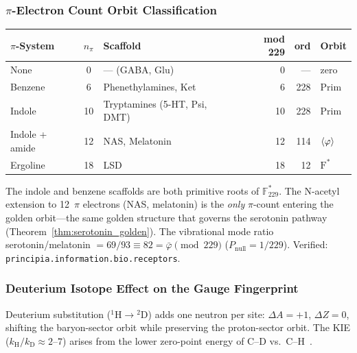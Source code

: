 \subsubsection{$\pi$-Electron Count Orbit Classification}

\begin{center}
\begin{tabular}{@{}lclrrl@{}}
\toprule
\textbf{$\pi$-System} & $n_\pi$ & \textbf{Scaffold} & \textbf{mod 229} & \textbf{ord} & \textbf{Orbit} \\
\midrule
None                   & 0  & --- (GABA, Glu)           & 0  & --- & zero \\
Benzene                & 6  & Phenethylamines, Ket      & 6  & 228 & Prim \\
Indole                 & 10 & Tryptamines (5-HT, Psi, DMT) & 10 & 228 & Prim \\
Indole + amide         & 12 & NAS, Melatonin            & 12 & 114 & $\langle\varphi\rangle$ \\
Ergoline               & 18 & LSD                       & 18 &  12 & $\mathrm{F}^*$ \\
\bottomrule
\end{tabular}
\end{center}

\begin{remark}
\label{rem:pi_golden}
The indole and benzene scaffolds are both primitive roots of $\mathbb{F}_{229}^*$. The N-acetyl extension to 12~$\pi$ electrons (NAS, melatonin) is the \emph{only} $\pi$-count entering the golden orbit---the same golden structure that governs the serotonin pathway (Theorem~\ref{thm:serotonin_golden}). The vibrational mode ratio serotonin/melatonin $= 69/93 \equiv 82 = \bar{\varphi} \pmod{229}$ ($P_{\text{null}} = 1/229$). Verified: \texttt{principia.information.bio.receptors}.
\end{remark}

\subsubsection{Deuterium Isotope Effect on the Gauge Fingerprint}

Deuterium substitution (${}^1\text{H} \to {}^2\text{D}$) adds one neutron per site: $\Delta A = +1$, $\Delta Z = 0$, shifting the baryon-sector orbit while preserving the proton-sector orbit. The KIE ($k_\text{H}/k_\text{D} \approx 2$--$7$) arises from the lower zero-point energy of C--D vs.\ C--H~\cite{FDA_austedo}.

